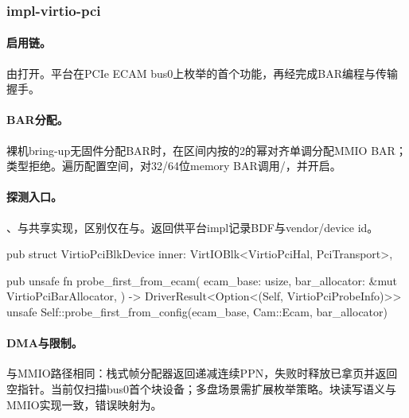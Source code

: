 
\subsubsection{impl-virtio-pci}

\paragraph{启用链。}由打开。平台在PCIe ECAM bus0上枚举的首个功能，再经完成BAR编程与传输握手。

\paragraph{BAR分配。}裸机bring-up无固件分配BAR时，在\code{[start,end)}区间内按的2的幂对齐单调分配MMIO BAR；类型拒绝。遍历配置空间，对32/64位memory BAR调用/，并开启。

\paragraph{探测入口。}、与共享实现，区别仅在与。返回供平台impl记录BDF与vendor/device id。

\begin{rustcode}
pub struct VirtioPciBlkDevice {
    inner: VirtIOBlk<VirtioPciHal, PciTransport>,
}

pub unsafe fn probe_first_from_ecam(
    ecam_base: usize,
    bar_allocator: &mut VirtioPciBarAllocator,
) -> DriverResult<Option<(Self, VirtioPciProbeInfo)>> {
    unsafe { Self::probe_first_from_config(ecam_base, Cam::Ecam, bar_allocator) }
}
\end{rustcode}

\paragraph{DMA与限制。}与MMIO路径相同：栈式帧分配器返回递减连续PPN，失败时释放已拿页并返回空指针。当前仅扫描bus0首个块设备；多盘场景需扩展枚举策略。块读写语义与MMIO实现一致，错误映射为。
